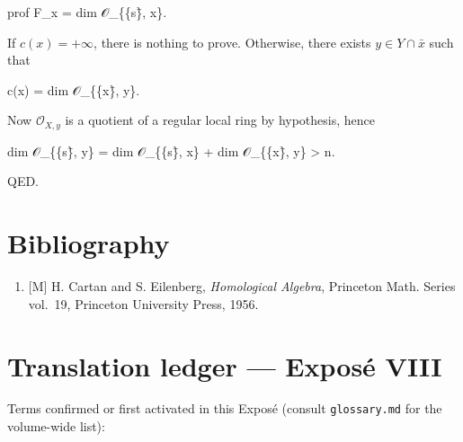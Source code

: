 \documentclass[
  11pt,
  a4paper,
]{book}
\newenvironment{Shaded}{}{}
\newcommand{\NormalTok}[1]{#1}
\providecommand{\tightlist}{%
  \setlength{\itemsep}{0pt}\setlength{\parskip}{0pt}}
\begin{document}
\begin{Shaded}
\begin{Highlighting}[]
\NormalTok{prof F\_x = dim 𝒪\_\{\{s\}̄, x\}.}
\end{Highlighting}
\end{Shaded}

If \(c(x) = +\infty\), there is nothing to prove. Otherwise, there
exists \(y \in Y \cap \bar{x}\) such that

\begin{Shaded}
\begin{Highlighting}[]
\NormalTok{c(x) = dim 𝒪\_\{\{x\}̄, y\}.}
\end{Highlighting}
\end{Shaded}

Now \(\mathcal{O}_{X, y}\) is a quotient of a regular local ring by
hypothesis, hence

\begin{Shaded}
\begin{Highlighting}[]
\NormalTok{dim 𝒪\_\{\{s\}̄, y\} = dim 𝒪\_\{\{s\}̄, x\} + dim 𝒪\_\{\{x\}̄, y\} \textgreater{} n.}
\end{Highlighting}
\end{Shaded}

QED.

\section{Bibliography}\label{bibliography-2}

\begin{enumerate}
\def\labelenumi{\arabic{enumi}.}
\tightlist
\item
  {[}M{]} H. Cartan and S. Eilenberg, \emph{Homological Algebra},
  Princeton Math. Series vol.~19, Princeton University Press, 1956.
\end{enumerate}

\section{Translation ledger --- Exposé
VIII}\label{translation-ledger-exposuxe9-viii}

Terms confirmed or first activated in this Exposé (consult
\texttt{glossary.md} for the volume-wide list):
\end{document}
